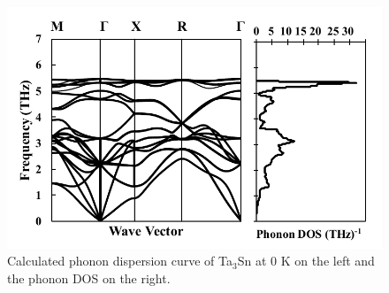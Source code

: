 \pagebreak
\begin{figure}[H]
	\centering
	\includegraphics[width=\textwidth]{Chapter-4/Figures/Ta3Snphonondos.pdf}
	\caption{Calculated phonon dispersion curve of Ta$_3$Sn at 0 K on the left and the phonon DOS on the right.}
	\label{Ch4-figure:Ta3Snphonon}
\end{figure}

